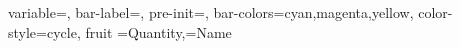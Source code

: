 \documentclass[12pt]{article}
\begin{document}
\DTLbarchart
{
 variable=\Quantity,%
 bar-label=\Name,
 pre-init={\DTLclearbarcolors},
 bar-colors={cyan,magenta,yellow},
 color-style=cycle,
}
{fruit}%
{\Quantity=Quantity,\Name=Name}%
 
\end{document}
